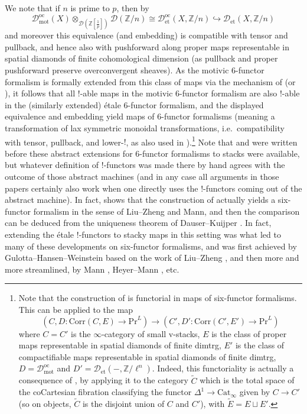 \documentclass[11pt]{amsart}
\numberwithin{equation}{section}
\numberwithin{theorem}{section}
\theoremstyle{definition}
\begin{document}
We note that if $n$ is prime to $p$, then by \cite[Proposition 12.3]{BerkovichMotives}
\[
\mathcal D_{\mathrm{mot}}^{\mathrm{oc}}(X)\otimes_{\mathcal D(\mathbb Z[\tfrac 1p])} \mathcal D(\mathbb Z/n)\cong \mathcal D_{\mathrm{et}}^{\mathrm{oc}}(X,\mathbb Z/n)\hookrightarrow \mathcal D_{\mathrm{et}}(X,\mathbb Z/n)
\]
and moreover this equivalence (and embedding) is compatible with tensor and pullback, and hence also with pushforward along proper maps representable in spatial diamonds of finite cohomological dimension (as pullback and proper pushforward preserve overconvergent sheaves). As the motivic $6$-functor formalism is formally extended from this class of maps via the mechanism of \cite[Theorem 5.19]{ScholzeSixFunctors} (or \cite[Theorem 3.4.11]{HeyerMann}), it follows that all $!$-able maps in the motivic $6$-functor formalism are also $!$-able in the (similarly extended) \'etale $6$-functor formalism, and the displayed equivalence and embedding yield maps of $6$-functor formalisms (meaning a transformation of lax symmetric monoidal transformations, i.e.~compatibility with tensor, pullback, and lower-$!$, as also used in \cite[Proposition 4.2.1]{HeyerMann}).\footnote{Note that the construction of \cite[Theorem 5.19]{ScholzeSixFunctors} is functorial in maps of six-functor formalisms. This can be applied to the map
\[
(C,D:\mathrm{Corr}(C,E)\to \mathrm{Pr}^L)\to (C',D':\mathrm{Corr}(C',E')\to \mathrm{Pr}^L)
\]
where $C=C'$ is the $\infty$-category of small v-stacks, $E$ is the class of proper maps representable in spatial diamonds of finite dimtrg, $E'$ is the class of compactifiable maps representable in spatial diamonds of finite dimtrg, $D=\mathcal D_{\mathrm{mot}}^{\mathrm{oc}}$ and $D'=\mathcal D_{\mathrm{et}}(-,\mathbb Z/\ell^n)$. Indeed, this functoriality is actually a consequence of \cite[Theorem 5.19]{ScholzeSixFunctors}, by applying it to the category $\tilde{C}$ which is the total space of the coCartesian fibration classifying the functor $\Delta^1\to \mathrm{Cat}_\infty$ given by $C\to C'$ (so on objects, $\tilde{C}$ is the disjoint union of $C$ and $C'$), with $\tilde{E}=E\sqcup E'$.} Note that \cite{FarguesScholze} and \cite{ECoD} were written before these abstract extensions for $6$-functor formalisms to stacks were available, but whatever definition of $!$-functors was made there by hand agrees with the outcome of those abstract machines (and in any case all arguments in those papers certainly also work when one directly uses the $!$-functors coming out of the abstract machine). In fact, \cite{GulottaHansenWeinstein} shows that the construction of \cite{ECoD} actually yields a six-functor formalism in the sense of Liu--Zheng and Mann, and then the comparison can be deduced from the uniqueness theorem of Dauser--Kuijper \cite{DauserKuijper}. In fact, extending the \'etale $!$-functors to stacky maps in this setting was what led to many of these developments on six-functor formalisms, and was first achieved by Gulotta--Hansen--Weinstein \cite{GulottaHansenWeinstein} based on the work of Liu--Zheng \cite{LiuZhengArtin}, and then more and more streamlined, by Mann \cite[Appendix A.5]{MannThesis}, Heyer--Mann \cite[Theorem 3.4.11]{HeyerMann}, etc.
\end{document}
